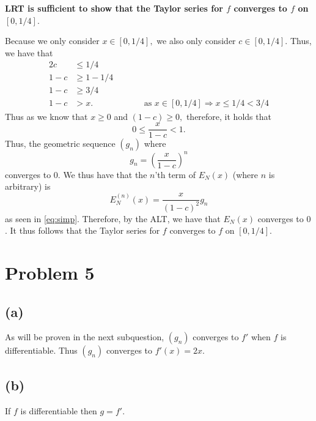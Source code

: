 \documentclass[10pt]{article}
\begin{document}
\noindent
\textbf{LRT is sufficient to show that the Taylor series for $f$ converges to $f$ on $[0, 1/4].$}

Because we only consider $x\in[0,1/4],$ we also only consider $c \in [0,1/4].$ Thus, we have that
\begin{alignat*}{2} 
    c &\le 1/4\\
    1-c &\ge 1 - 1/4 \qquad&&\\
    1-c &\ge 3/4\\
    1-c&> x. && \text{as $x\in[0,1/4]\Rightarrow x\le1/4<3/4$}
\end{alignat*}
Thus as we know that $x\ge0$ and $(1-c)\ge 0,$ therefore, it holds that
\[0\le\frac{x}{1-c}< 1.\]
Thus, the geometric sequence $(g_n)$ where
\[g_n = \left( \frac{x}{1-c}\right ) ^n\] 
converges to $0$. We thus have that the $n$'th term of $E_N(x)$ (where $n$ is arbitrary) 
is
\[E_N^{(n)}(x) = \frac{x}{(1-c)^2}g_n\]
as seen in \eqref{eq:simp}. Therefore, by the ALT, we have that $E_N(x)$ converges to $0$. It thus follows that the Taylor series for $f$ converges to $f$ on $[0, 1/4].$

\newpage
\section*{Problem 5}

\subsection*{(a)}

As will be proven in the next subquestion, $(g_n)$ converges to $f'$ when $f$ is differentiable. Thus $(g_n)$ converges to $f'(x)=2x.$

\subsection*{(b)}

If $f$ is differentiable then $g = f'.$
\end{document}
